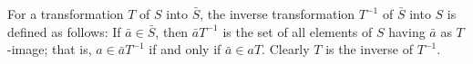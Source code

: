 For a transformation $T$ of $S$ into $\bar{S}$, the inverse transformation $T^{-1}$ of $\bar{S}$ into $S$ is defined as follows: If $\bar{a} \in \bar{S}$, then $\bar{a}T^{-1}$ is the set of all elements of $S$ having $\bar{a}$ as $T$-image; that is, $a \in \bar{a}T^{-1}$ if and only if $\bar{a} \in aT$. Clearly $T$ is the inverse of $T^{-1}$.
